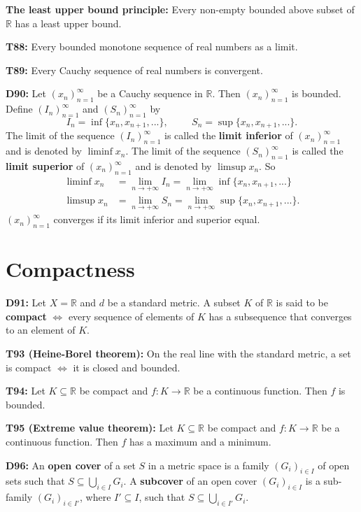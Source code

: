 \documentclass[twocolumn,10pt]{article}
\begin{document}
\textbf{The least upper bound principle:} Every non-empty bounded above subset of $\mathbb{R}$ has a least upper bound.

\textbf{T88:} Every bounded monotone sequence of real numbers as a limit.

\textbf{T89:} Every Cauchy sequence of real numbers is convergent.

\textbf{D90:} Let $(x_n)_{n=1}^{\infty}$ be a Cauchy sequence in $\mathbb{R}$. Then $(x_n)_{n=1}^{\infty}$ is bounded. Define $(I_n)_{n=1}^{\infty}$ and $(S_n)_{n=1}^{\infty}$ by
\begin{equation*}
    I_n = \inf\{x_n,x_{n+1},...\}, \hspace{1cm} S_n = \sup\{x_n,x_{n+1},...\}.
\end{equation*}
The limit of the sequence $(I_n)_{n=1}^{\infty}$ is called the \textbf{limit inferior} of $(x_n)_{n=1}^{\infty}$ and is denoted by $\liminf x_n$. The limit of the sequence $(S_n)_{n=1}^{\infty}$ is called the \textbf{limit superior} of $(x_n)_{n=1}^{\infty}$ and is denoted by $\limsup x_n$. So
\begin{align*}
    \liminf x_n &= \lim_{n\to+\infty}I_n = \lim_{n\to+\infty}\inf\{x_n,x_{n+1},...\}\\
    \limsup x_n &= \lim_{n\to+\infty}S_n = \lim_{n\to+\infty}\sup\{x_n,x_{n+1},...\}.
\end{align*}
$(x_n)_{n=1}^{\infty}$ converges if its limit inferior and superior equal.

\section{Compactness}

\textbf{D91:} Let $X=\mathbb{R}$ and $d$ be a standard metric. A subset $K$ of $\mathbb{R}$ is said to be \textbf{compact} $\Leftrightarrow$ every sequence of elements of $K$ has a subsequence that converges to an element of $K$.


\textbf{T93 (Heine-Borel theorem):} On the real line with the standard metric, a set is compact $\Leftrightarrow$ it is closed and bounded.


\textbf{T94:} Let $K\subseteq\mathbb{R}$ be compact and $f:K\to\mathbb{R}$ be a continuous function. Then $f$ is bounded.

\textbf{T95 (Extreme value theorem):} Let $K\subseteq\mathbb{R}$ be compact and $f:K\to\mathbb{R}$ be a continuous function. Then $f$ has a maximum and a minimum.

\textbf{D96:} An \textbf{open cover} of a set $S$ in a metric space is a family $(G_i)_{i\in I}$ of open sets such that $S\subseteq\bigcup_{i\in I}G_i$. A \textbf{subcover} of an open cover $(G_i)_{i\in I}$ is a sub-family $(G_i)_{i\in I'}$, where $I'\subseteq I$, such that $S\subseteq\bigcup_{i\in I'}G_i$.
\end{document}
